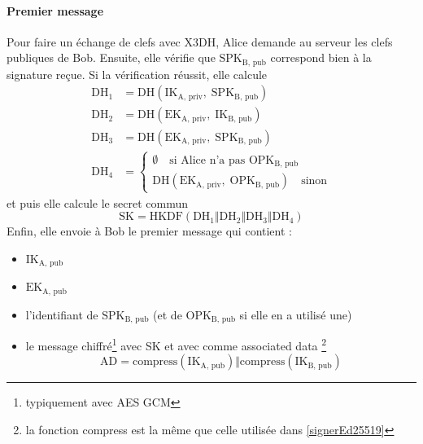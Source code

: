 \documentclass[a4paper, 12pt]{article}
\begin{document}
\paragraph{Premier message}
Pour faire un échange de clefs avec X3DH, Alice demande au serveur les clefs publiques de Bob. Ensuite, elle vérifie que $\text{SPK}_{\text{B, pub}}$ correspond bien à la signature reçue. Si la vérification réussit, elle calcule 
\begin{align*}
	\text{DH}_1 &= \hyperref[DH]{\text{DH}}\left(\text{IK}_{\text{A, priv}}, \;\text{SPK}_{\text{B, pub}}\right)\\
	\text{DH}_2 &= \hyperref[DH]{\text{DH}}\left(\text{EK}_{\text{A, priv}}, \;\text{IK}_{\text{B, pub}}\right)\\
	\text{DH}_3 &= \hyperref[DH]{\text{DH}}\left(\text{EK}_{\text{A, priv}}, \;\text{SPK}_{\text{B, pub}}\right)\\
	\text{DH}_4 &= \begin{cases}\emptyset \quad\text{si Alice n'a pas $\text{OPK}_{\text{B, pub}}$}\\\hyperref[DH]{\text{DH}}\left(\text{EK}_{\text{A, priv}}, \;\text{OPK}_{\text{B, pub}}\right) \quad\text{sinon}\end{cases}
\end{align*}
et puis elle calcule le secret commun 
$$\text{SK} = \hyperref[HKDF]{\text{HKDF}}\left(\text{DH}_1\hyperref[concat]{\Vert}\text{DH}_2\hyperref[concat]{\Vert}\text{DH}_3\hyperref[concat]{\Vert}\text{DH}_4\right)$$
Enfin, elle envoie à Bob le premier message qui contient :
\begin{itemize}
	\item $\text{IK}_{\text{A, pub}}$
	\item $\text{EK}_{\text{A, pub}}$
	\item l'identifiant de $\text{SPK}_{\text{B, pub}}$ (et de $\text{OPK}_{\text{B, pub}}$ si elle en a utilisé une)
	\item le message chiffré\footnote{typiquement avec AES GCM} avec SK et avec comme associated data \footnote{la fonction compress est la même que celle utilisée dans \ref{signerEd25519}}
$$\text{AD} = \text{compress}(\text{IK}_{\text{A, pub}}) \hyperref[concat]{\Vert} \text{compress}(\text{IK}_{\text{B, pub}})$$\end{itemize}
\end{document}
